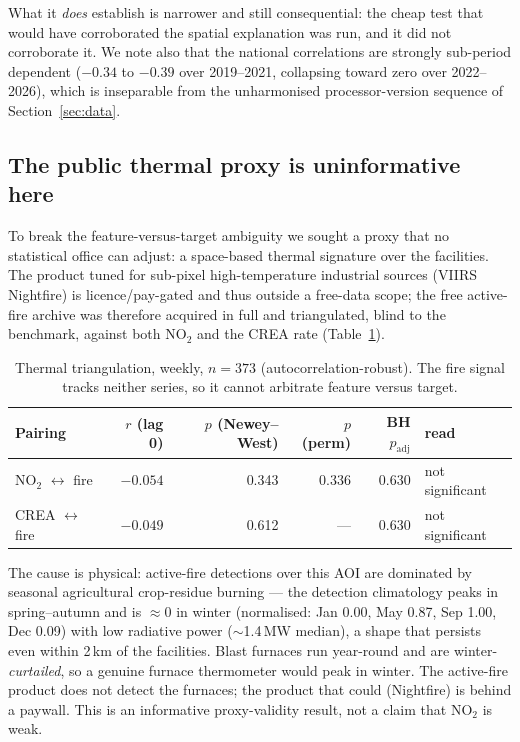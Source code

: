 \documentclass[11pt,a4paper]{article}
\providecommand{\ce}[1]{\ensuremath{\mathrm{#1}}}
\begin{document}
What it \emph{does} establish is narrower and still consequential: the cheap test that would have
corroborated the spatial explanation was run, and it did not corroborate it. We note also that the
national correlations are strongly sub-period dependent ($-0.34$ to $-0.39$ over 2019--2021,
collapsing toward zero over 2022--2026), which is inseparable from the unharmonised
processor-version sequence of Section~\ref{sec:data}.

\subsection{The public thermal proxy is uninformative here}
\label{sec:viirs}

To break the feature-versus-target ambiguity we sought a proxy that no statistical office can
adjust: a space-based thermal signature over the facilities. The product tuned for sub-pixel
high-temperature industrial sources (VIIRS Nightfire) is licence/pay-gated and thus outside a
free-data scope; the free active-fire archive was therefore acquired in full and triangulated,
blind to the benchmark, against both \ce{NO_2} and the CREA rate (Table~\ref{tab:viirs}).

\begin{table}[t]
\centering
\caption{Thermal triangulation, weekly, $n=373$ (autocorrelation-robust). The fire signal tracks
neither series, so it cannot arbitrate feature versus target.}
\label{tab:viirs}
\small
\begin{tabular}{lrrrrl}
\toprule
Pairing & $r$ (lag 0) & $p$ (Newey--West) & $p$ (perm) & BH $p_{\text{adj}}$ & read \\
\midrule
\ce{NO_2} $\leftrightarrow$ fire & $-0.054$ & 0.343 & 0.336 & 0.630 & not significant \\
CREA $\leftrightarrow$ fire      & $-0.049$ & 0.612 & ---   & 0.630 & not significant \\
\bottomrule
\end{tabular}
\end{table}

The cause is physical: active-fire detections over this AOI are dominated by seasonal
agricultural crop-residue burning --- the detection climatology peaks in spring--autumn and is
$\approx0$ in winter (normalised: Jan 0.00, May 0.87, Sep 1.00, Dec 0.09) with low radiative
power ($\sim$1.4\,MW median), a shape that persists even within 2\,km of the facilities. Blast
furnaces run year-round and are winter-\emph{curtailed}, so a genuine furnace thermometer would
peak in winter. The active-fire product does not detect the furnaces; the product that could
(Nightfire) is behind a paywall. This is an informative proxy-validity result, not a claim that
\ce{NO_2} is weak.
\end{document}
